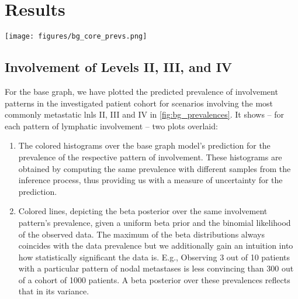 \documentclass[twocolumn]{aastex631}
\begin{document}
\section{Results}
\label{sec:results}

\begin{figure*}
    \begin{centering}
        \texttt{[image: figures/bg\_core\_prevs.png]}
        \caption{Prevalence of involvement as predicted by the base graph model for different scenarios involving the most commonly metastatic \glspl{lnl} II, III and IV (shaded histograms). The model's predictions are compared to Beta posteriors over the prevalence based on the frequency of the same scenarios and a uniform prior (slid lines). The top panel shows some selected scenarios with early T-category tumors and the bottom panel with late T-category.}
        \label{fig:bg_prevalences}
    \end{centering}
\end{figure*}


\subsection{Involvement of Levels II, III, and IV}
\label{subsec:results:lnls_II_III_IV}

For the base graph, we have plotted the predicted prevalence of involvement patterns in the investigated patient cohort for scenarios involving the most commonly metastatic \glspl{lnl} II, III and IV in \cref{fig:bg_prevalences}. It shows -- for each pattern of lymphatic involvement -- two plots overlaid:

\begin{enumerate}
    \item The colored histograms over the base graph model's prediction for the prevalence of the respective pattern of involvement. These histograms are obtained by computing the same prevalence with different samples from the inference process, thus providing us with a measure of uncertainty for the prediction.
    \item Colored lines, depicting the beta posterior over the same involvement pattern's prevalence, given a uniform beta prior and the binomial likelihood of the observed data. The maximum of the beta distributions always coincides with the data prevalence but we additionally gain an intuition into how statistically significant the data is. E.g., Observing 3 out of 10 patients with a particular pattern of nodal metastases is less convincing than 300 out of a cohort of 1000 patients. A beta posterior over these prevalences reflects that in its variance.
\end{enumerate}
\end{document}
